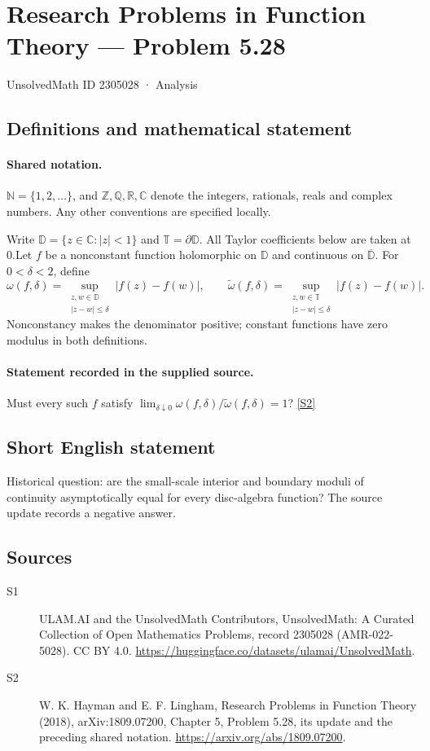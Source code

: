 \documentclass[11pt]{article}
\newcommand{\sref}[2]{\hyperlink{source:#1:#2}{[S#2]}}
\begin{document}
\setcounter{section}{2305027}
\section{Research Problems in Function Theory — Problem 5.28}\label{2305028}
{\small\sffamily UnsolvedMath ID 2305028 · Analysis}
\subsection{Definitions and mathematical statement}

\paragraph{Shared notation.}$\mathbb N=\{1,2,\ldots\}$, and $\mathbb Z,\mathbb Q,\mathbb R,\mathbb C$ denote the integers, rationals, reals and complex numbers. Any other conventions are specified locally.


Write $\mathbb D=\{z\in\mathbb C:|z|<1\}$ and $\mathbb T=\partial\mathbb D$. All Taylor coefficients below are taken at $0$.Let $f$ be a nonconstant function holomorphic on $\mathbb D$ and continuous on $\overline{\mathbb D}$. For $0<\delta<2$, define
\[\omega(f,\delta)=\sup_{\substack{z,w\in\mathbb D\\|z-w|\le\delta}}|f(z)-f(w)|,\qquad
\widetilde\omega(f,\delta)=\sup_{\substack{z,w\in\mathbb T\\|z-w|\le\delta}}|f(z)-f(w)|.
\]
Nonconstancy makes the denominator positive; constant functions have zero modulus in both definitions.
\paragraph{Statement recorded in the supplied source.}
Must every such $f$ satisfy $\lim_{\delta\downarrow0}\omega(f,\delta)/\widetilde\omega(f,\delta)=1$? \sref{2305028}{2}
\subsection{Short English statement}
Historical question: are the small-scale interior and boundary moduli of continuity asymptotically equal for every disc-algebra function? The source update records a negative answer.
\subsection{Sources}
\begin{description}
\item[\hypertarget{source:2305028:1}{S1}] ULAM.AI and the UnsolvedMath Contributors, UnsolvedMath: A Curated Collection of Open Mathematics Problems, record 2305028 (AMR-022-5028). CC BY 4.0. \url{https://huggingface.co/datasets/ulamai/UnsolvedMath}.
\item[\hypertarget{source:2305028:2}{S2}] W. K. Hayman and E. F. Lingham, Research Problems in Function Theory (2018), arXiv:1809.07200, Chapter 5, Problem 5.28, its update and the preceding shared notation. \url{https://arxiv.org/abs/1809.07200}.
\end{description}
\label{end:2305028}
\end{document}

